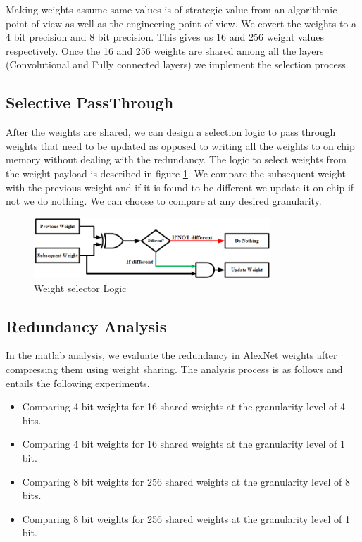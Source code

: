 \documentclass[conference]{IEEEtran}
\begin{document}
Making weights assume same values is of strategic value from an algorithmic point of view as well as the engineering point of view. We covert the weights to a 4 bit precision and 8 bit precision. This gives us 16 and 256 weight values respectively. Once the 16 and 256 weights are shared among all the layers (Convolutional and Fully connected layers) we implement the selection process. 


\subsection{Selective PassThrough}
After the weights are shared, we can design a selection logic to pass through weights that need to be updated as opposed to writing all the weights to on chip memory without dealing with the redundancy. The logic to select weights from the weight payload is described in figure \ref{sel}. We compare the subsequent weight with the previous weight and if it is found to be different we update it on chip if not we do nothing. We can choose to compare at any desired granularity.

\begin{figure}[!ht]
\centering
\includegraphics[width=3.5in]{selector}
\caption{Weight selector Logic}
\label{sel}
\end{figure}

\subsection{Redundancy Analysis}
In the matlab analysis, we evaluate the redundancy in AlexNet weights after compressing them using weight sharing. 
The analysis process is as follows and entails the following experiments.
\begin{itemize}
\item Comparing 4 bit weights for 16 shared weights at the granularity level of 4 bits. 

\item Comparing 4 bit weights for 16 shared weights at the granularity level of 1 bit. 

\item Comparing 8 bit weights for 256 shared weights at the granularity level of 8 bits. 

\item Comparing 8 bit weights for 256 shared weights at the granularity level of 1 bit. 
\end{itemize}
\end{document}
